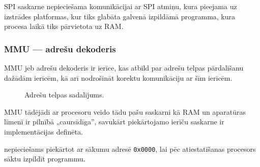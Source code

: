 	SPI saskarne nepieciešama komunikācijai ar SPI  atmiņu,
	kura pieejama uz izstrādes platformas,\cite[43.~lpp.]{FusionGuide}
	kur tiks glabāta galvenā izpildāmā programma, kura  procesa
	laikā tiks pārvietota uz RAM.

\subsubsection{MMU — adrešu dekoderis} \label{sec:mmu}
	MMU jeb adrešu dekoderis ir ierīce, kas atbild par adrešu telpas
	pārdalīšanu dažādām ierīcēm, kā arī nodrošināt korektu komunikāciju
	ar šīm ierīcēm.
	
	\begin{figure}[thp]
		\centering
		\def\svgwidth{0.75\textwidth}
		{\ttfamily\small}
		\caption{Adrešu telpas sadalījums.}
		\label{fig:memory-map}
	\end{figure}
	
	MMU tādējādi ar procesoru veido tādu pašu saskarni kā RAM un aparatūras
	līmenī ir pilnībā „caursīdīga”, savukārt piekārtojamo ierīču saskarne
	ir implementācijas definēta.
	
	 nepieciešams piekārtot ar sākumu adresē \texttt{0x0000},
	lai pēc atiestatīšanas procesors sāktu izpildīt  programmu.
